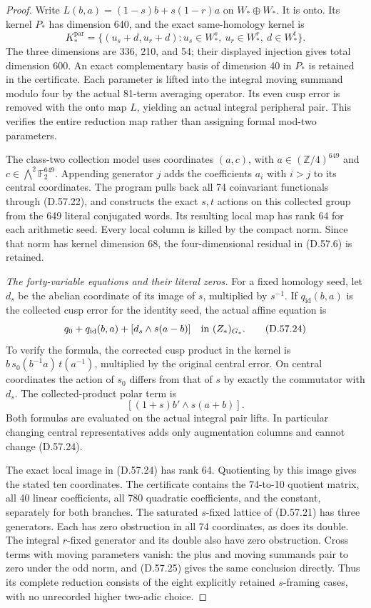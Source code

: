 \begin{proof}
Write
\(L(b,a)=(1-s)b+s(1-r)a\) on \(W_*\oplus W_*\).
It is onto. Its kernel \(P_*\) has dimension 640,
and the exact same-homology kernel is
\[
 K_*^{\mathrm{par}}=
 \{(u_s+d,u_r+d):
           u_s\in W_*^s,\ u_r\in W_*^r,\ d\in W_*^t\}.
 \tag{D.57.23}
\]
The three dimensions are 336, 210, and 54; their
displayed injection gives total dimension 600.
An exact complementary basis of dimension 40 in
\(P_*\) is retained in the certificate.
Each parameter is lifted into the integral moving
summand modulo four by the actual 81-term averaging
operator. Its even cusp error is removed with the
onto map \(L\), yielding an actual integral
peripheral pair. This verifies the entire reduction
map rather than assigning formal mod-two parameters.

The class-two collection model uses coordinates
\((a,c)\), with \(a\in(\mathbb Z/4)^{649}\) and
\(c\in\bigwedge^2\mathbb F_2^{649}\). Appending
generator \(j\) adds the coefficients
\(a_i\) with \(i>j\) to its central coordinates.
The program pulls back all 74 coinvariant functionals
through (D.57.22), and constructs the exact
\(s,t\) actions on this collected group from the
649 literal conjugated words. Its resulting local
map has rank 64 for each arithmetic seed. Every
local column is killed by the compact norm.
Since that norm has kernel dimension 68, the
four-dimensional residual in (D.57.6) is retained.

\emph{The forty-variable equations and their literal zeros.}
For a fixed homology seed, let \(d_s\) be the
abelian coordinate of its image of \(s\), multiplied
by \(s^{-1}\). If \(q_{\mathrm{id}}(b,a)\) is the
collected cusp error for the identity seed, the
actual affine equation is
\[
 q_0+q_{\mathrm{id}}(b,a)
       +[d_s\wedge s(a-b)]
       \quad\hbox{in }(Z_*)_{G_*}.
 \tag{D.57.24}
\]
To verify the formula, the corrected cusp product
in the kernel is
\(b\,s_0(b^{-1}a)\,t(a^{-1})\), multiplied by
the original central error. On central coordinates
the action of \(s_0\) differs from that of \(s\)
by exactly the commutator with \(d_s\).
The collected-product polar term is
\[
       [(1+s)b'\wedge s(a+b)] .
 \tag{D.57.25}
\]
Both formulas are evaluated on the actual integral
pair lifts. In particular changing central
representatives adds only augmentation columns
and cannot change (D.57.24).

The exact local image in (D.57.24) has rank 64.
Quotienting by this image gives the stated ten
coordinates. The certificate contains the
74-to-10 quotient matrix, all 40 linear
coefficients, all 780 quadratic coefficients,
and the constant, separately for both branches.
The saturated \(s\)-fixed lattice of (D.57.21)
has three generators. Each has zero obstruction
in all 74 coordinates, as does its double.
The integral \(r\)-fixed generator and its
double also have zero obstruction. Cross terms
with moving parameters vanish: the plus and
moving summands pair to zero under the odd
norm, and (D.57.25) gives the same conclusion
directly. Thus its complete reduction consists
of the eight explicitly retained \(s\)-framing
cases, with no unrecorded higher two-adic choice.


\end{proof}
